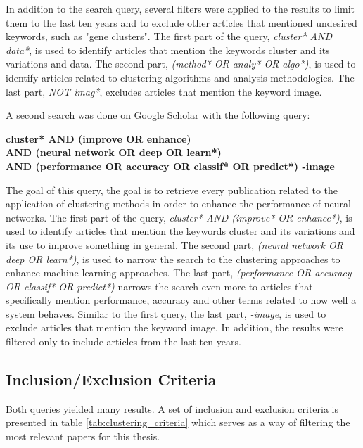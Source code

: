 In addition to the search query, several filters were applied to the results to limit them to the last ten years and to exclude other articles that mentioned undesired keywords, such as "gene clusters". The first part of the query, \textit{cluster* AND data*}, is used to identify articles that mention the keywords cluster and its variations and data. The second part, \textit{(method* OR analy* OR algo*)}, is used to identify articles related to clustering algorithms and analysis methodologies. The last part, \textit{NOT imag*}, excludes articles that mention the keyword image.

A second search was done on Google Scholar with the following query:
\begin{center}
    \textbf{cluster* AND (improve OR enhance) \\AND (neural network OR deep OR learn*) \\AND (performance OR accuracy OR classif* OR predict*) -image}
\end{center}

The goal of this query, the goal is to retrieve every publication related to the application of clustering methods in order to enhance the performance of neural networks. The first part of the query, \textit{cluster* AND (improve* OR enhance*)}, is used to identify articles that mention the keywords cluster and its variations and its use to improve something in general. The second part, \textit{(neural network OR deep OR learn*)}, is used to narrow the search to the clustering approaches to enhance machine learning approaches. The last part, \textit{(performance OR accuracy OR classif* OR predict*)} narrows the search even more to articles that specifically mention performance, accuracy and other terms related to how well a system behaves. Similar to the first query, the last part, \textit{-image}, is used to exclude articles that mention the keyword image. In addition, the results were filtered only to include articles from the last ten years.


\subsection{Inclusion/Exclusion Criteria}\label{sec:cluster_inclusion_exclusion}
Both queries yielded many results. A set of inclusion and exclusion criteria is presented in table \ref{tab:clustering_criteria} which serves as a way of filtering the most relevant papers for this thesis.

